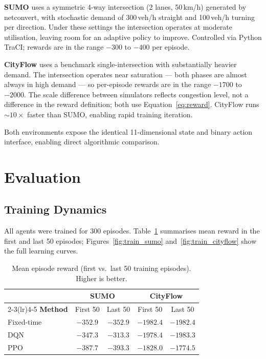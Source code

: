 \documentclass[twoside,11pt]{article}
\begin{document}
\textbf{SUMO} uses a symmetric 4-way intersection (2 lanes, 50\,km/h) generated
by netconvert, with stochastic demand of 300\,veh/h straight and 100\,veh/h
turning per direction.  Under these settings the intersection operates at
moderate utilisation, leaving room for an adaptive policy to improve.
Controlled via Python TraCI; rewards are in the range $-300$ to $-400$
per episode.

\textbf{CityFlow} uses a benchmark single-intersection with substantially
heavier demand.  The intersection operates near saturation — both phases are
almost always in high demand — so per-episode rewards are in the range
$-1700$ to $-2000$.  The scale difference between simulators reflects
congestion level, not a difference in the reward definition; both use
Equation~\ref{eq:reward}.  CityFlow runs ${\sim}10{\times}$ faster than
SUMO, enabling rapid training iteration.

Both environments expose the identical 11-dimensional state and binary action
interface, enabling direct algorithmic comparison.

\section{Evaluation}

\subsection{Training Dynamics}

All agents were trained for 300 episodes.  Table~\ref{tab:training} summarises
mean reward in the first and last 50 episodes; Figures~\ref{fig:train_sumo}
and~\ref{fig:train_cityflow} show the full learning curves.

\begin{table}[H]
\centering
\caption{Mean episode reward (first vs.\ last 50 training episodes).
Higher is better.}
\label{tab:training}
\begin{tabular}{lcccc}
\toprule
 & \multicolumn{2}{c}{\textbf{SUMO}} & \multicolumn{2}{c}{\textbf{CityFlow}} \\
\cmidrule(lr){2-3}\cmidrule(lr){4-5}
\textbf{Method} & First 50 & Last 50 & First 50 & Last 50 \\
\midrule
Fixed-time & $-352.9$ & $-352.9$ & $-1982.4$ & $-1982.4$ \\
DQN        & $-347.3$ & $\mathbf{-313.3}$ & $-1978.4$ & $-1983.3$ \\
PPO        & $-387.7$ & $-393.3$ & $-1828.0$ & $\mathbf{-1774.5}$ \\
\bottomrule
\end{tabular}
\end{table}
\end{document}
